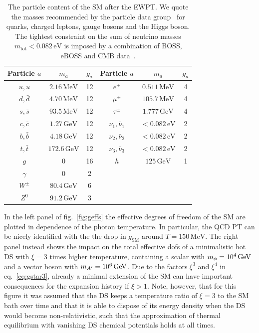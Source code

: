 \begin{table}
	\centering
	\begin{tabular}{ccc|ccc}
		\toprule
		Particle $a$ & $m_a$ & $g_a$ & Particle $a$ & $m_a$ & $g_a$   \\
		\midrule  $u, \bar{u}$ & $2.16 \, \mathrm{MeV}$ & 12 & $e^{ \pm}$ & $0.511 \, \mathrm{MeV}$ & 4  \\
		$d, \bar{d}$ & $4.70\, \mathrm{MeV}$ &  12 & $\mu^{ \pm}$ & $105.7 \,\mathrm{MeV}$ & 4 \\
		$s, \bar{s}$ & $93.5\, \mathrm{MeV}$ & 12  & $\tau^{ \pm}$ & $1.777 \,\mathrm{GeV}$ & 4  \\
		$c, \bar{c}$ & $1.27 \,\mathrm{GeV}$ & 12  & $\nu_1, \bar{\nu}_1$ & $<0.082 \,\mathrm{eV}$ & 2\\
		$b, \bar{b}$ & $4.18\, \mathrm{GeV}$ & 12  & $\nu_2, \bar{\nu}_2$ & $<0.082\, \mathrm{eV}$ & 2\\
		$t, \bar{t}$ & $172.6\,\mathrm{GeV}$ & 12  & $\nu_3, \bar{\nu}_3$ & $<0.082\, \mathrm{eV}$ & 2 \\
		\midrule  $g$ & 0 & 16 &  $h$ & $125\, \mathrm{GeV}$ & 1\\
		$\gamma$ & 0 & 2 &&&\\
		$W^{ \pm}$ & $80.4 \,\mathrm{GeV}$ & 6&&& \\
		$Z^0$ & $91.2 \,\mathrm{GeV}$ & 3&&& \\
		\bottomrule
	\end{tabular}
	\caption{The particle content of the \ac{SM} after the \ac{EWPT}. We quote the masses recommended by the particle data group~\cite{ParticleDataGroup:2022pth} for quarks, charged leptons, gauge bosons and the Higgs boson. The tightest constraint on the sum of neutrino masses $m_\text{tot} < 0.082 \, \text{eV}$ is imposed by a combination of BOSS, eBOSS and \ac{CMB} data~\cite{Brieden:2022lsd}.}
	\label{tab:SM}
\end{table}

In the left panel of fig.~\ref{fig:geffs} the effective degrees of freedom of the \ac{SM} are plotted in dependence of the photon temperature. In particular, the \ac{QCD} \ac{PT} can be nicely identified with the the drop in $g_\text{SM}$ around $T = 150 \, \text{MeV}$. The right panel instead shows the impact on the total effective \acp{dof}  of a minimalistic hot \ac{DS} with $\xi = 3$ times higher temperature, containing a  scalar with $m_\phi = 10^4 \, \text{GeV}$ and a vector boson with $m_{A^\prime} = 10^6 \, \text{GeV}$. Due to the factors $\xi^3$ and $\xi^4$ in eq.~\eqref{eq:gstar3}, already a minimal extension of the \ac{SM} can have important consequences for the expansion history if $\xi > 1$. Note, however, that for this figure it was assumed that the \ac{DS} keeps a temperature ratio of $\xi = 3$ to the \ac{SM} bath over time and that it is able to dispose of its energy density when the \ac{DS} would become non-relativistic, such that the approximation of thermal equilibrium with vanishing \ac{DS} chemical potentials holds at all times.



